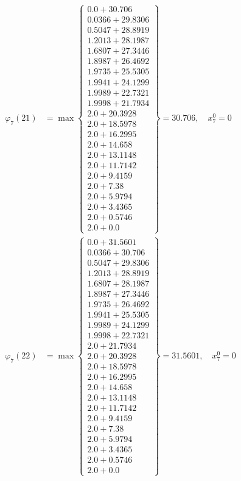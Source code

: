 \documentclass{article}
\begin{document}
\begin{align*}
  
  
  
\varphi_{7}(21) &= \max \left\{ \begin{array}{c}
0.0 + 30.706 \\
 0.0366 + 29.8306 \\
 0.5047 + 28.8919 \\
 1.2013 + 28.1987 \\
 1.6807 + 27.3446 \\
 1.8987 + 26.4692 \\
 1.9735 + 25.5305 \\
 1.9941 + 24.1299 \\
 1.9989 + 22.7321 \\
 1.9998 + 21.7934 \\
 2.0 + 20.3928 \\
 2.0 + 18.5978 \\
 2.0 + 16.2995 \\
 2.0 + 14.658 \\
 2.0 + 13.1148 \\
 2.0 + 11.7142 \\
 2.0 + 9.4159 \\
 2.0 + 7.38 \\
 2.0 + 5.9794 \\
 2.0 + 3.4365 \\
 2.0 + 0.5746 \\
 2.0 + 0.0
\end{array} \right\}=30.706,\quad x_{7}^0=0\\
  
  
  
  
\varphi_{7}(22) &= \max \left\{ \begin{array}{c}
0.0 + 31.5601 \\
 0.0366 + 30.706 \\
 0.5047 + 29.8306 \\
 1.2013 + 28.8919 \\
 1.6807 + 28.1987 \\
 1.8987 + 27.3446 \\
 1.9735 + 26.4692 \\
 1.9941 + 25.5305 \\
 1.9989 + 24.1299 \\
 1.9998 + 22.7321 \\
 2.0 + 21.7934 \\
 2.0 + 20.3928 \\
 2.0 + 18.5978 \\
 2.0 + 16.2995 \\
 2.0 + 14.658 \\
 2.0 + 13.1148 \\
 2.0 + 11.7142 \\
 2.0 + 9.4159 \\
 2.0 + 7.38 \\
 2.0 + 5.9794 \\
 2.0 + 3.4365 \\
 2.0 + 0.5746 \\
 2.0 + 0.0
\end{array} \right\}=31.5601,\quad x_{7}^0=0\\
  

\end{align*}
\end{document}
